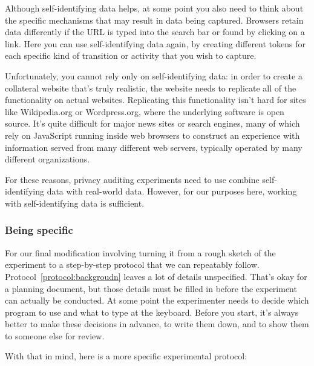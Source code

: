 Although self-identifying data helps, at some point you also need to
think about the specific mechanisms that may result in data being
captured. Browsers retain data differently if the URL is typed
into the search bar or found by clicking on a link. Here you can use
self-identifying data again, by creating different tokens for each
specific kind of transition or activity that you wish to capture. 

Unfortunately, you cannot rely only on self-identifying data: in order
to create a collateral website that's truly realistic, the website
needs to replicate all of the functionality on actual
websites. Replicating this functionality isn't hard for sites like
Wikipedia.org or Wordpress.org, where the underlying software is open
source. It's quite difficult for major news sites or search engines,
many of which rely on JavaScript running inside web browsers to
construct an experience with information served from many different
web servers, typically operated by many different organizations.

For these reasons, privacy auditing experiments need to use combine
self-identifying data with real-world data. However, for our purposes
here, working with self-identifying data is sufficient.

\subsubsection{Being specific}
For our final modification involving turning it from a rough sketch of
the experiment to a step-by-step protocol that we can repeatably
follow. Protocol~\ref{protocol:backgroudn} leaves a lot of details
unspecified. That's okay for a planning document, but those details
must be filled in before the experiment can actually be
conducted. At some point the experimenter needs to decide which
program to use and what to type at the keyboard. Before you start, it's always 
better to make these decisions in advance, to write them down, and to
show them to someone else for review.

With that in mind, here is a more specific experimental protocol:

